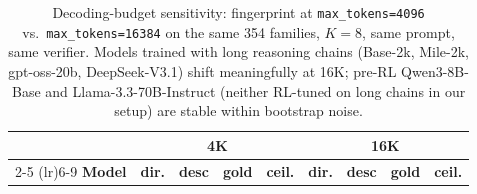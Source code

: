 \begin{table}[h]
\centering
\footnotesize
\caption{Decoding-budget sensitivity: fingerprint at \texttt{max\_tokens=4096} vs.\ \texttt{max\_tokens=16384} on the same 354 families, $K{=}8$, same prompt, same verifier. Models trained with long reasoning chains (Base-2k, Mile-2k, gpt-oss-20b, DeepSeek-V3.1) shift meaningfully at 16K; pre-RL Qwen3-8B-Base and Llama-3.3-70B-Instruct (neither RL-tuned on long chains in our setup) are stable within bootstrap noise.}
\label{tab:panel_4k_vs_16k}
\vspace{4pt}
\setlength{\tabcolsep}{4pt}
\begin{tabular}{lrrrrrrrr}
\toprule
& \multicolumn{4}{c}{\textbf{4K}} & \multicolumn{4}{c}{\textbf{16K}} \\
\cmidrule(lr){2-5} \cmidrule(lr){6-9}
\textbf{Model} & \textbf{dir.} & \textbf{desc} & \textbf{gold} & \textbf{ceil.} & \textbf{dir.} & \textbf{desc} & \textbf{gold} & \textbf{ceil.} \\
\midrule
\bottomrule
\end{tabular}
\end{table}
